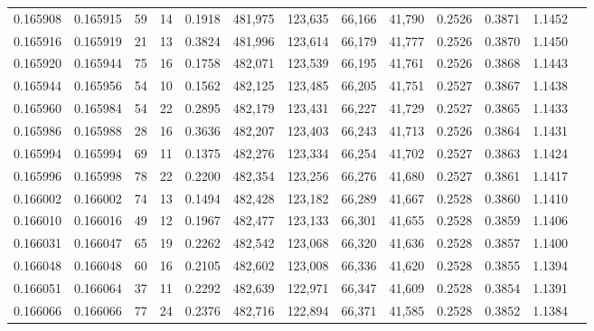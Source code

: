 \begin{tabular}{rrrrrrrrrrrrr}
0.165908 & 0.165915 &    59 &  14 &                                     0.1918 & 481,975 & 123,635 &  66,166 &  41,790 & 0.2526 & 0.3871 & 1.1452 \\
0.165916 & 0.165919 &    21 &  13 &                                     0.3824 & 481,996 & 123,614 &  66,179 &  41,777 & 0.2526 & 0.3870 & 1.1450 \\
0.165920 & 0.165944 &    75 &  16 &                                     0.1758 & 482,071 & 123,539 &  66,195 &  41,761 & 0.2526 & 0.3868 & 1.1443 \\
0.165944 & 0.165956 &    54 &  10 &                                     0.1562 & 482,125 & 123,485 &  66,205 &  41,751 & 0.2527 & 0.3867 & 1.1438 \\
0.165960 & 0.165984 &    54 &  22 &                                     0.2895 & 482,179 & 123,431 &  66,227 &  41,729 & 0.2527 & 0.3865 & 1.1433 \\
0.165986 & 0.165988 &    28 &  16 &                                     0.3636 & 482,207 & 123,403 &  66,243 &  41,713 & 0.2526 & 0.3864 & 1.1431 \\
0.165994 & 0.165994 &    69 &  11 &                                     0.1375 & 482,276 & 123,334 &  66,254 &  41,702 & 0.2527 & 0.3863 & 1.1424 \\
0.165996 & 0.165998 &    78 &  22 &                                     0.2200 & 482,354 & 123,256 &  66,276 &  41,680 & 0.2527 & 0.3861 & 1.1417 \\
0.166002 & 0.166002 &    74 &  13 &                                     0.1494 & 482,428 & 123,182 &  66,289 &  41,667 & 0.2528 & 0.3860 & 1.1410 \\
0.166010 & 0.166016 &    49 &  12 &                                     0.1967 & 482,477 & 123,133 &  66,301 &  41,655 & 0.2528 & 0.3859 & 1.1406 \\
0.166031 & 0.166047 &    65 &  19 &                                     0.2262 & 482,542 & 123,068 &  66,320 &  41,636 & 0.2528 & 0.3857 & 1.1400 \\
0.166048 & 0.166048 &    60 &  16 &                                     0.2105 & 482,602 & 123,008 &  66,336 &  41,620 & 0.2528 & 0.3855 & 1.1394 \\
0.166051 & 0.166064 &    37 &  11 &                                     0.2292 & 482,639 & 122,971 &  66,347 &  41,609 & 0.2528 & 0.3854 & 1.1391 \\
0.166066 & 0.166066 &    77 &  24 &                                     0.2376 & 482,716 & 122,894 &  66,371 &  41,585 & 0.2528 & 0.3852 & 1.1384 \\

\end{tabular}
